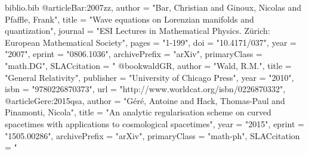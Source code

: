

\begin{filecontents}{biblio.bib}
%
%
@article{Bar:2007zz,
      author         = "Bar, Christian and Ginoux, Nicolas and Pfaffle, Frank",
      title          = "Wave equations on Lorenzian manifolds and quantization",
      journal        = "ESI Lectures in Mathematical Physics. Zürich: European Mathematical Society",
      pages          = "1-199",
      doi            = "10.4171/037",
      year           = "2007",
      eprint         = "0806.1036",
      archivePrefix  = "arXiv",
      primaryClass   = "math.DG",
      SLACcitation   = "%
}
%
%
@book{waldGR,
      author         = "Wald, R.M.",
      title          = "General Relativity",
      publisher      = "University of Chicago Press",
      year           = "2010",
      isbn           = "9780226870373",
      url            =  "http://www.worldcat.org/isbn/0226870332",
}
%
%
@article{Gere:2015qsa,
      author         = "Géré, Antoine and Hack, Thomas-Paul and Pinamonti, Nicola",
      title          = "An analytic regularisation scheme on curved spacetimes with applications to cosmological spacetimes",
      year           = "2015",
      eprint         = "1505.00286",
      archivePrefix  = "arXiv",
      primaryClass   = "math-ph",
      SLACcitation   = "%
}
%
%
\end{filecontents}


\documentclass{book}


\usepackage{amscd}
\usepackage{amsmath}
\usepackage{amsfonts}
\usepackage{amsthm}
\usepackage{amssymb}
\usepackage{amsxtra}
\usepackage{array} 
\usepackage[english]{babel}
\usepackage{color}
\usepackage[T1]{fontenc}
\usepackage{geometry}
\usepackage{hyperref}
\usepackage[utf8]{inputenc} 



